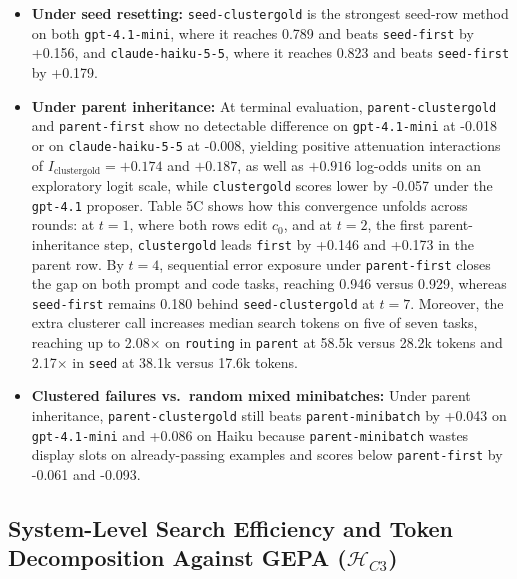 \documentclass[10pt]{article}
\providecommand{\tightlist}{%
  \setlength{\itemsep}{0pt}\setlength{\parskip}{0pt}}
\begin{document}
\begin{itemize}
\tightlist
\item
  \textbf{Under seed resetting:} \texttt{seed-clustergold} is the
  strongest seed-row method on both \texttt{gpt-4.1-mini}, where it
  reaches 0.789 and beats \texttt{seed-first} by +0.156, and
  \texttt{claude-haiku-5-5}, where it reaches 0.823 and beats
  \texttt{seed-first} by +0.179.
\item
  \textbf{Under parent inheritance:} At terminal evaluation,
  \texttt{parent-clustergold} and \texttt{parent-first} show no
  detectable difference on \texttt{gpt-4.1-mini} at -0.018 or on
  \texttt{claude-haiku-5-5} at -0.008, yielding positive attenuation
  interactions of \(I_{\text{clustergold}} = +0.174\) and \(+0.187\), as
  well as \(+0.916\) log-odds units on an exploratory logit scale, while
  \texttt{clustergold} scores lower by -0.057 under the \texttt{gpt-4.1}
  proposer. Table 5C shows how this convergence unfolds across rounds:
  at \(t=1\), where both rows edit \(c_0\), and at \(t=2\), the first
  parent-inheritance step, \texttt{clustergold} leads \texttt{first} by
  +0.146 and +0.173 in the parent row. By \(t=4\), sequential error
  exposure under \texttt{parent-first} closes the gap on both prompt and
  code tasks, reaching 0.946 versus 0.929, whereas \texttt{seed-first}
  remains 0.180 behind \texttt{seed-clustergold} at \(t=7\). Moreover,
  the extra clusterer call increases median search tokens on five of
  seven tasks, reaching up to 2.08\(\times\) on \texttt{routing} in
  \texttt{parent} at 58.5k versus 28.2k tokens and 2.17\(\times\) in
  \texttt{seed} at 38.1k versus 17.6k tokens.
\item
  \textbf{Clustered failures vs.~random mixed minibatches:} Under parent
  inheritance, \texttt{parent-clustergold} still beats
  \texttt{parent-minibatch} by +0.043 on \texttt{gpt-4.1-mini} and
  +0.086 on Haiku because \texttt{parent-minibatch} wastes display slots
  on already-passing examples and scores below \texttt{parent-first} by
  -0.061 and -0.093.
\end{itemize}

\hypertarget{system-level-search-efficiency-and-token-decomposition-against-gepa-mathcalh_c3}{%
\subsection{\texorpdfstring{System-Level Search Efficiency and Token
Decomposition Against GEPA
(\(\mathcal{H}_{C3}\))}{System-Level Search Efficiency and Token Decomposition Against GEPA (\textbackslash mathcal\{H\}\_\{C3\})}}\label{system-level-search-efficiency-and-token-decomposition-against-gepa-mathcalh_c3}}
\end{document}
